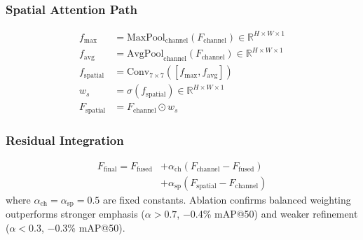 \documentclass[preprint,12pt]{elsarticle}
\begin{document}
\subsubsection{Spatial Attention Path}

\begin{align}
f_{\text{max}} &= \text{MaxPool}_{\text{channel}}(F_{\text{channel}}) \in \mathbb{R}^{H \times W \times 1} \\
f_{\text{avg}} &= \text{AvgPool}_{\text{channel}}(F_{\text{channel}}) \in \mathbb{R}^{H \times W \times 1} \\
f_{\text{spatial}} &= \text{Conv}_{7\times7}([f_{\text{max}}, f_{\text{avg}}]) \\
w_s &= \sigma(f_{\text{spatial}}) \in \mathbb{R}^{H \times W \times 1} \\
F_{\text{spatial}} &= F_{\text{channel}} \odot w_s
\end{align}

\subsubsection{Residual Integration}

\begin{equation}
\begin{split}
F_{\text{final}} = F_{\text{fused}} &+ \alpha_{\text{ch}} (F_{\text{channel}} - F_{\text{fused}}) \\
&+ \alpha_{\text{sp}} (F_{\text{spatial}} - F_{\text{channel}})
\end{split}
\end{equation}
where $\alpha_{\text{ch}} = \alpha_{\text{sp}} = 0.5$ are fixed constants.
Ablation confirms balanced weighting outperforms stronger emphasis
($\alpha > 0.7$, $-$0.4\% mAP@50) and weaker refinement ($\alpha < 0.3$,
$-$0.3\% mAP@50).
\end{document}
